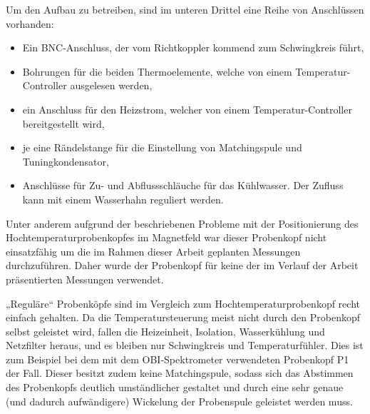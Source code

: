 Um den Aufbau zu betreiben, sind im unteren Drittel eine Reihe von Anschlüssen vorhanden:
\begin{itemize}
	\item Ein BNC-Anschluss, der vom Richtkoppler kommend zum Schwingkreis führt,
	\item Bohrungen für die beiden Thermoelemente, welche von einem Temperatur-Controller ausgelesen werden,
	\item ein Anschluss für den Heizstrom, welcher von einem Temperatur-Controller bereitgestellt wird,
	\item je eine Rändelstange für die Einstellung von Matching\-spu\-le und Tuningkondensator,
	\item Anschlüsse für Zu- und Abflussschläuche für das Kühlwasser. Der Zufluss kann mit einem Wasserhahn reguliert werden.
\end{itemize}

Unter anderem aufgrund der beschriebenen Probleme mit der Positionierung des Hochtemperaturprobenkopfes im Magnetfeld war dieser Probenkopf nicht einsatzfähig um die im Rahmen dieser Arbeit geplanten Messungen durchzuführen. Daher wurde der Probenkopf für keine der im Verlauf der Arbeit präsentierten Messungen verwendet.

„Reguläre“ Probenköpfe sind im Vergleich zum Hochtemperaturprobenkopf recht einfach gehalten. Da die Temperatursteuerung meist nicht durch den Probenkopf selbst geleistet wird, fallen die Heizeinheit, Isolation, Wasserkühlung und Netzfilter heraus, und es bleiben nur Schwingkreis und Temperaturfühler. Dies ist zum Beispiel bei dem mit dem OBI-Spektrometer verwendeten Probenkopf P1 der Fall. Dieser besitzt zudem keine Match\-ing\-spu\-le, sodass sich das Abstimmen des Probenkopfs deutlich umständlicher gestaltet und durch eine sehr genaue (und dadurch aufwändigere) Wickelung der Probenspule geleistet werden muss.

